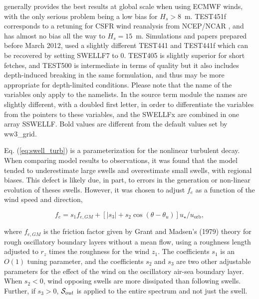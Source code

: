 \begin{table}
{generally provides the best results at global scale when using ECMWF winds,
with the only serious problem being a low bias for $H_s > 8$~m.  TEST451f
corresponds to a retuning for CSFR wind reanalysis from NCEP/NCAR
\citep{art:CFSRR10}, and has almost no bias all the way to $H_s =
15$~m. Simulations and papers prepared before March 2012, used a slightly
different TEST441 and TEST441f which can be recovered by setting SWELLF7 to 0.
TEST405 is slightly superior for short fetches, and TEST500 is intermediate in
terms of quality but it also includes depth-induced breaking in the same
formulation, and thus may be more appropriate for depth-limited conditions.
Please note that the name of the variables only apply to the namelists. In the
source term module the names are slightly different, with a doubled first
letter, in order to differentiate the variables from the pointers to these
variables, and the SWELLFx are combined in one array SSWELLF. Bold values are
different from the default values set by ww3\_grid.} \label{tab:ST4_parSIN}
\end{table}


Eq. (\ref{eq:swell_turb}) is a parameterization for the
nonlinear turbulent decay. When comparing model results to observations, it
was found that the model tended to underestimate large swells and overestimate
small swells, with regional biases. This defect is likely due, in part, to
errors in the generation or non-linear evolution of theses swells. However, it
was chosen to adjust $f_e$ as a function of the wind speed and direction,

\begin{equation}
f_e = s_1 f_{e,GM} + \left[\left|s_3\right| + s_2 \cos
(\theta-\theta_u)\right]u_\star / u_{\mathrm{orb}},\label{fevar}
\end{equation}

\noindent 
where $f_{e,GM}$ is the friction factor given by Grant and Madsen's
(1979)\nocite{art:GM79} theory for rough oscillatory boundary layers without a
mean flow, using a roughness length adjusted to $r_z$ times the roughness for
the wind $z_1$. The coefficients $s_1$ is an $O(1)$ tuning parameter, and the
coefficients $s_2$ and $s_3$ are two other adjustable parameters for the
effect of the wind on the oscillatory air-sea boundary layer. When $s_2 < 0$,
wind opposing swells are more dissipated than following swells. Further, if
$s_3 > 0$, ${\cal S}_{out}$ is applied to the entire spectrum and not just the
swell.

